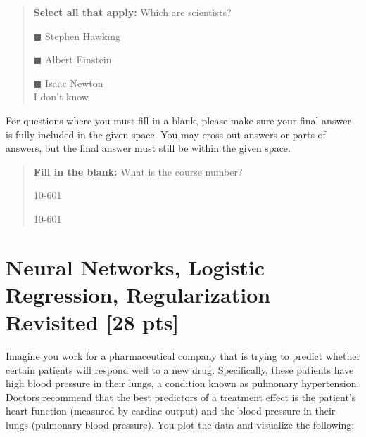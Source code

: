 \documentclass[12pt,addpoints,answers]{exam}
\begin{document}
\begin{quote}
\textbf{Select all that apply:} Which are scientists?
    \begin{list}{}
    \item $\blacksquare$ Stephen Hawking 
    \item $\blacksquare$ Albert Einstein
    \item $\blacksquare$ Isaac Newton\\
    \xcancel{$\blacksquare$} I don't know
\end{list}
\end{quote}

For questions where you must fill in a blank, please make sure your final answer is fully included in the given space. You may cross out answers or parts of answers, but the final answer must still be within the given space.

\begin{quote}
\textbf{Fill in the blank:} What is the course number?

\begin{tcolorbox}[fit,height=1cm, width=4cm, blank, borderline={1pt}{-2pt},nobeforeafter]
    \begin{center}\huge10-601\end{center}
    \end{tcolorbox}\hspace{2cm}
    \begin{tcolorbox}[fit,height=1cm, width=4cm, blank, borderline={1pt}{-2pt},nobeforeafter]
    \begin{center}\huge10-601\end{center}
    \end{tcolorbox}
\end{quote}

\clearpage

\section{Neural Networks, Logistic Regression, Regularization Revisited [28 pts]}

    \textbf{} Imagine you work for a pharmaceutical company that is trying to predict whether certain patients will respond well to a new drug. Specifically, these patients have high blood pressure in their lungs, a condition known as pulmonary hypertension. Doctors recommend that the best predictors of a treatment effect is the patient's heart function (measured by cardiac output) and the blood pressure in their lungs (pulmonary blood pressure). You plot the data and visualize the following:
    
\end{document}
